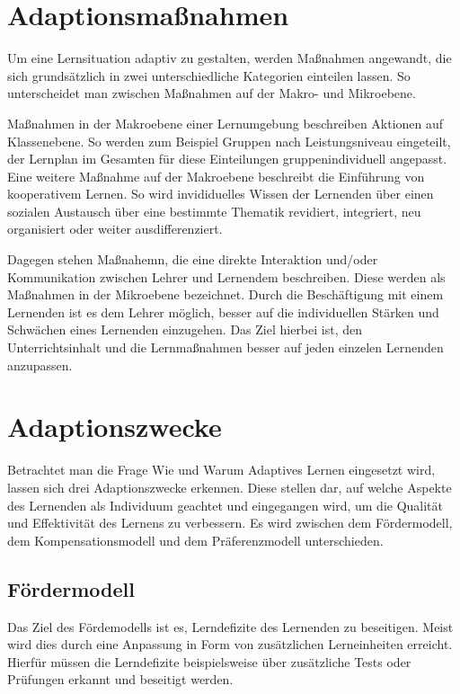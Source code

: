 \section{Adaptionsmaßnahmen}
Um eine Lernsituation adaptiv zu gestalten, werden Maßnahmen angewandt, die sich grundsätzlich in zwei
unterschiedliche Kategorien einteilen lassen. So unterscheidet man zwischen Maßnahmen auf der Makro- und Mikroebene.

Maßnahmen in der Makroebene einer Lernumgebung beschreiben Aktionen auf Klassenebene.
So werden zum Beispiel Gruppen nach Leistungsniveau eingeteilt, der Lernplan im Gesamten für
diese Einteilungen gruppenindividuell angepasst. Eine weitere Maßnahme auf der Makroebene beschreibt
die Einführung von kooperativem Lernen. So wird invididuelles Wissen der Lernenden über einen sozialen Austausch
über eine bestimmte Thematik revidiert, integriert, neu organisiert oder weiter ausdifferenziert.

Dagegen stehen Maßnahemn, die eine direkte Interaktion und/oder Kommunikation zwischen Lehrer und Lernendem beschreiben.
Diese werden als Maßnahmen in der Mikroebene bezeichnet. Durch die Beschäftigung mit einem Lernenden
ist es dem Lehrer möglich, besser auf die individuellen Stärken und Schwächen eines Lernenden einzugehen.
Das Ziel hierbei ist, den Unterrichtsinhalt und die Lernmaßnahmen besser auf jeden einzelen Lernenden anzupassen.

\section{Adaptionszwecke}
Betrachtet man die Frage Wie und Warum Adaptives Lernen eingesetzt wird, lassen sich drei Adaptionszwecke erkennen.
Diese stellen dar, auf welche Aspekte des Lernenden als Individuum geachtet und eingegangen wird, um die
Qualität und Effektivität des Lernens zu verbessern.
Es wird zwischen dem Fördermodell, dem Kompensationsmodell und dem Präferenzmodell unterschieden.

\subsection{Fördermodell}
Das Ziel des Fördemodells ist es, Lerndefizite des Lernenden zu beseitigen.
Meist wird dies durch eine Anpassung in Form von zusätzlichen Lerneinheiten erreicht.
Hierfür müssen die Lerndefizite beispielsweise über zusätzliche Tests oder Prüfungen erkannt
und beseitigt werden. \cite[S. 19]{lehmann2010lernstile}

